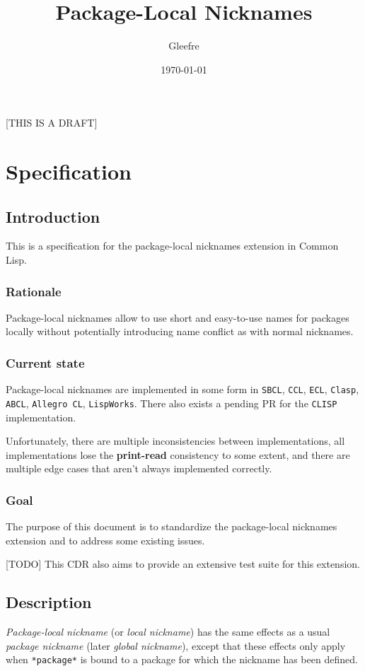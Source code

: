 \documentclass[11pt]{article}
\author{Gleefre}
\date{\today}
\title{Package-Local Nicknames}
\begin{document}
\maketitle
\tableofcontents

[THIS IS A DRAFT]

\section{Specification}
\label{sec:orgf3af91d}

\subsection{Introduction}
\label{sec:org5d8273a}
This is a specification for the package-local nicknames extension in Common Lisp.
\subsubsection{Rationale}
\label{sec:orgb643c04}
Package-local nicknames allow to use short and easy-to-use names for packages
locally without potentially introducing name conflict as with normal nicknames.
\subsubsection{Current state}
\label{sec:org7e3082f}
Package-local nicknames are implemented in some form in \texttt{SBCL}, \texttt{CCL}, \texttt{ECL},
\texttt{Clasp}, \texttt{ABCL}, \texttt{Allegro CL}, \texttt{LispWorks}. There also exists a pending PR for the
\texttt{CLISP} implementation.

Unfortunately, there are multiple inconsistencies between implementations, all
implementations lose the \textbf{print-read} consistency to some extent, and there are
multiple edge cases that aren't always implemented correctly.
\subsubsection{Goal}
\label{sec:org8fb02b4}
The purpose of this document is to standardize the package-local nicknames
extension and to address some existing issues.

[TODO] This CDR also aims to provide an extensive test suite for this extension.
\subsection{Description}
\label{sec:org45b0dfd}
\emph{Package-local nickname} (or \emph{local nickname}) has the same effects as a usual
\emph{package nickname} (later \emph{global nickname}), except that these effects only apply
when \texttt{*package*} is bound to a package for which the nickname has been defined.
\end{document}
